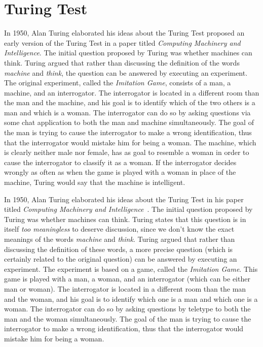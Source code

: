 \section{Turing Test}
In 1950, Alan Turing elaborated his ideas about the Turing Test proposed an early version of the Turing Test in a paper titled \textit{Computing Machinery and Intelligence}. The initial question proposed by Turing was whether machines can think. Turing argued that rather than discussing the definition of the words \textit{machine} and \textit{think}, the question can be answered by executing an experiment. The original experiment, called the \textit{Imitation Game}, consists of a man, a machine, and an interrogator. The interrogator is located in a different room than the man and the machine, and his goal is to identify which of the two others is a man and which is a woman. The interrogator can do so by asking questions via some chat application to both the man and machine simultaneously. The goal of the man is trying to cause the interrogator to make a wrong identification, thus that the interrogator would mistake him for being a woman. The machine, which is clearly neither male nor female, has as goal to resemble a woman in order to cause the interrogator to classify it as a woman. If the interrogator decides wrongly as often as when the game is played with a woman in place of the machine, Turing would say that the machine is intelligent.

In 1950, Alan Turing elaborated his ideas about the Turing Test in his paper titled \textit{Computing Machinery and Intelligence}~\cite{turing1950computing}. The initial question proposed by Turing was whether machines can think. Turing states that this question is in itself \textit{too meaningless} to deserve discussion, since we don't know the exact meanings of the words \textit{machine} and \textit{think}. Turing argued that rather than discussing the definition of these words, a more precise question (which is certainly related to the original question) can be answered by executing an experiment. The experiment is based on a game, called the \textit{Imitation Game}. This game is played with a man, a woman, and an interrogator (which can be either man or woman). The interrogator is located in a different room than the man and the woman, and his goal is to identify which one is a man and which one is a woman. The interrogator can do so by asking questions by teletype to both the man and the woman simultaneously. The goal of the man is trying to cause the interrogator to make a wrong identification, thus that the interrogator would mistake him for being a woman.

